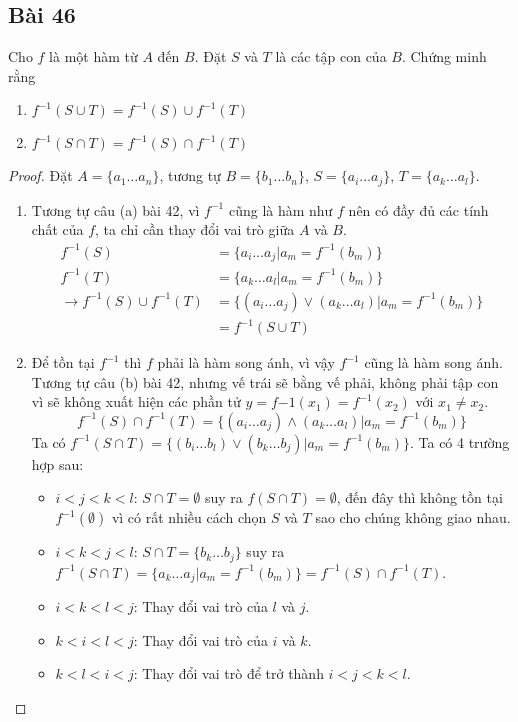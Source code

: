 \subsection*{Bài 46}
Cho $f$ là một hàm từ $A$ đến $B$. Đặt $S$ và $T$ là các tập con của $B$. Chứng minh rằng
\begin{enumerate}[label=\alph*)]
    \item $f^{-1}(S\cup T)=f^{-1}(S)\cup f^{-1}(T)$
    \item $f^{-1}(S\cap T)=f^{-1}(S)\cap f^{-1}(T)$
\end{enumerate}
\begin{proof}
    Đặt $A=\{a_1\dots a_n\}$, tương tự $B=\{b_1\dots b_n\}$, $S=\{a_i\dots a_j\}$, $T=\{a_k\dots a_l\}$.
    \begin{enumerate}[label=\alph*)]
        \item Tương tự câu (a) bài 42, vì $f^{-1}$ cũng là hàm như $f$ nên có đầy đủ các tính chất của $f$, ta chỉ cần thay đổi vai trò giữa $A$ và $B$. \begin{align*}
            f^{-1}(S)&=\{a_i\dots a_j|a_m=f^{-1}(b_m)\}\\
            f^{-1}(T)&=\{a_k\dots a_l|a_m=f^{-1}(b_m)\}\\
            \rightarrow f^{-1}(S)\cup f^{-1}(T)&=\{(a_i\dots a_j)\lor(a_k\dots a_l)|a_m=f^{-1}(b_m)\}\\
            &=f^{-1}(S\cup T)
        \end{align*}
        \item Để tồn tại $f^{-1}$ thì $f$ phải là hàm song ánh, vì vậy $f^{-1}$ cũng là hàm song ánh. Tương tự câu (b) bài 42, nhưng vế trái sẽ bằng vế phải, không phải tập con vì sẽ không xuất hiện các phần tử $y=f{-1}(x_1)=f^{-1}(x_2)$ với $x_1\neq x_2$. $$f^{-1}(S)\cap f^{-1}(T)=\{(a_i\dots a_j)\land(a_k\dots a_l)|a_m=f^{-1}(b_m)\}$$
        Ta có $f^{-1}(S\cap T)=\{(b_i\dots b_l)\lor(b_k\dots b_j)|a_m=f^{-1}(b_m)\}$. Ta có 4 trường hợp sau: \begin{itemize}
            \item $i<j<k<l$: $S\cap T=\emptyset$ suy ra $f(S\cap T)=\emptyset$, đến đây thì không tồn tại $f^{-1}(\emptyset)$ vì có rất nhiều cách chọn $S$ và $T$ sao cho chúng không giao nhau.
            \item $i<k<j<l$: $S\cap T=\{b_k\dots b_j\}$ suy ra $f^{-1}(S\cap T)=\{a_k\dots a_j|a_m=f^{-1}(b_m)\}=f^{-1}(S)\cap f^{-1}(T)$.
            \item $i<k<l<j$: Thay đổi vai trò của $l$ và $j$.
            \item $k<i<l<j$: Thay đổi vai trò của $i$ và $k$.
            \item $k<l<i<j$: Thay đổi vai trò để trở thành $i<j<k<l$.
        \end{itemize}
    \end{enumerate}
\end{proof}
